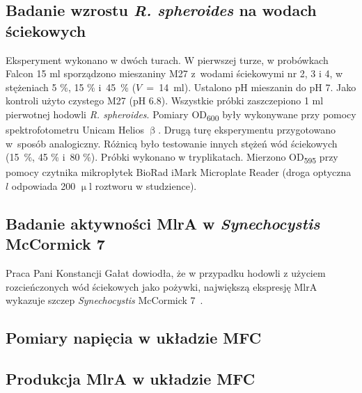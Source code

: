 \subsection{Badanie wzrostu \textit{R. spheroides} na wodach ściekowych}\label{subsec:rhodobacter}
Eksperyment wykonano w dwóch turach.
W pierwszej turze, w probówkach Falcon 15 ml sporządzono
mieszaniny M27 z~wodami ściekowymi nr 2, 3 i 4,
w stężeniach 5 \%, 15 \% i~45~\% ($V$~=~14~ml).
Ustalono pH mieszanin do pH 7.
Jako kontroli użyto czystego M27 (pH 6.8).
Wszystkie próbki zaszczepiono 1 ml pierwotnej hodowli
\textit{R. spheroides}.
Pomiary OD\textsubscript{600} były wykonywane przy pomocy
spektrofotometru Unicam Helios $\upbeta$.
Drugą turę eksperymentu przygotowano w~sposób analogiczny.
Różnicą było testowanie innych stężeń wód ściekowych
(15~\%, 45 \% i~80 \%).
Próbki wykonano w tryplikatach.
Mierzono OD\textsubscript{595} przy pomocy czytnika
mikropłytek BioRad iMark Microplate Reader
(droga optyczna $l$ odpowiada 200 $\upmu$l roztworu w studzience).

\subsection{Badanie aktywności MlrA w \textit{Synechocystis} McCormick 7}\label{subsec:mlra}
Praca Pani Konstancji Gałat dowiodła, że w przypadku
hodowli z użyciem rozcieńczonych wód ściekowych jako pożywki,
największą ekspresję MlrA wykazuje szczep
\textit{Synechocystis} McCormick 7~\cite{Galat2022}.

\subsection{Pomiary napięcia w układzie MFC}\label{subsec:volt}

\subsection{Produkcja MlrA w układzie MFC}\label{subsec:mfc}